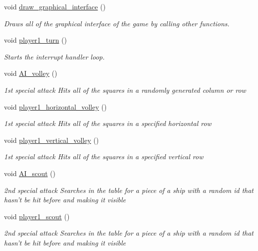 \begin{DoxyCompactItemize}
void \hyperlink{group___commodore_ga84e9359a75282d371df5147d92df8968}{draw\-\_\-graphical\-\_\-interface} ()
\begin{DoxyCompactList}\small\item\em Draws all of the graphical interface of the game by calling other functions. \end{DoxyCompactList}\item 
void \hyperlink{group___commodore_ga77a34fc2954901da52aed534b7b0874a}{player1\-\_\-turn} ()
\begin{DoxyCompactList}\small\item\em Starts the interrupt handler loop. \end{DoxyCompactList}\item 
void \hyperlink{group___commodore_ga6ccf45b205e8ea940b94f13da211036d}{A\-I\-\_\-volley} ()
\begin{DoxyCompactList}\small\item\em 1st special attack Hits all of the squares in a randomly generated column or row \end{DoxyCompactList}\item 
void \hyperlink{group___commodore_ga2daf3b99f0028c329f3a5c455e081969}{player1\-\_\-horizontal\-\_\-volley} ()
\begin{DoxyCompactList}\small\item\em 1st special attack Hits all of the squares in a specified horizontal row \end{DoxyCompactList}\item 
void \hyperlink{group___commodore_gabb0bb8dc5c46c01a17042e09db8553e6}{player1\-\_\-vertical\-\_\-volley} ()
\begin{DoxyCompactList}\small\item\em 1st special attack Hits all of the squares in a specified vertical row \end{DoxyCompactList}\item 
void \hyperlink{group___commodore_ga6bf4095c9c593c16da8ddebf531e55dc}{A\-I\-\_\-scout} ()
\begin{DoxyCompactList}\small\item\em 2nd special attack Searches in the table for a piece of a ship with a random id that hasn't be hit before and making it visible \end{DoxyCompactList}\item 
void \hyperlink{group___commodore_ga401f37af0576f6669a67f08c659dc44e}{player1\-\_\-scout} ()
\begin{DoxyCompactList}\small\item\em 2nd special attack Searches in the table for a piece of a ship with a random id that hasn't be hit before and making it visible \end{DoxyCompactList}\item 

\end{DoxyCompactItemize}
